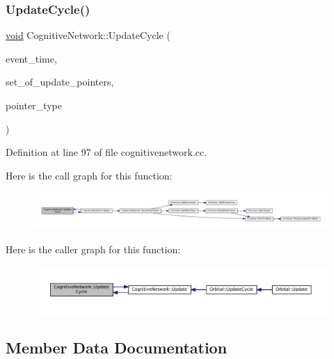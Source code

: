 \subsubsection{\texorpdfstring{Update\+Cycle()}{UpdateCycle()}}
{\footnotesize\ttfamily \mbox{\hyperlink{glad_8h_a950fc91edb4504f62f1c577bf4727c29}{void}} Cognitive\+Network\+::\+Update\+Cycle (\begin{DoxyParamCaption}\item[{std\+::chrono\+::time\+\_\+point$<$ \mbox{\hyperlink{universe_8h_a0ef8d951d1ca5ab3cfaf7ab4c7a6fd80}{Clock}} $>$}]{event\+\_\+time,  }\item[{std\+::vector$<$ \mbox{\hyperlink{class_cognitive_network}{Cognitive\+Network}} $\ast$$>$}]{set\+\_\+of\+\_\+update\+\_\+pointers,  }\item[{unsigned int}]{pointer\+\_\+type }\end{DoxyParamCaption})}



Definition at line 97 of file cognitivenetwork.\+cc.

Here is the call graph for this function\+:\nopagebreak
\begin{figure}[H]
\begin{center}
\leavevmode
\includegraphics[width=350pt]{class_cognitive_network_aa37dda869174e4eef986cca4ce3e55d2_cgraph}
\end{center}
\end{figure}
Here is the caller graph for this function\+:\nopagebreak
\begin{figure}[H]
\begin{center}
\leavevmode
\includegraphics[width=350pt]{class_cognitive_network_aa37dda869174e4eef986cca4ce3e55d2_icgraph}
\end{center}
\end{figure}


\subsection{Member Data Documentation}
\mbox{\label{class_cognitive_network_a5a46cefb188858fdc023df3abbac0a47}} 
